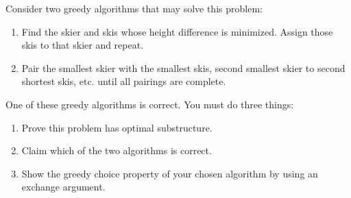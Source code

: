 \documentclass[10pt]{article}
\begin{document}
\noindent Consider two greedy algorithms that may solve this problem:

\begin{enumerate}
  \item Find the skier and skis whose height difference is minimized. Assign those skis to that skier and repeat.
  \item Pair the smallest skier with the smallest skis, second smallest skier to second shortest skis, etc. until all pairings are complete.
\end{enumerate}

\noindent One of these greedy algorithms is correct. You must do three things: 

\begin{enumerate}



  \item Prove this problem has optimal substructure. 

  \solution{
  }



  \item Claim which of the two algorithms is correct. 

  \solution{
  }



  \item Show the greedy choice property of your chosen algorithm by using an exchange argument.

  \solution{
  }

\end{enumerate}
\end{document}

